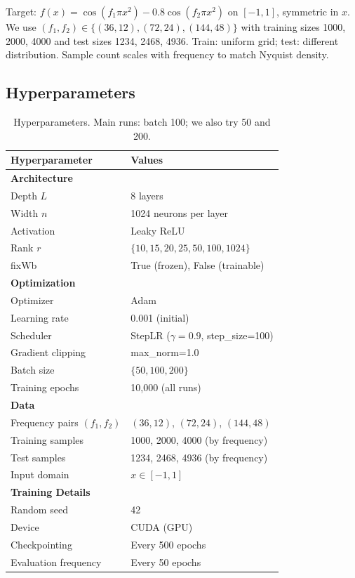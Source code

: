 \documentclass[nohyperref]{article}
\theoremstyle{plain}
\theoremstyle{definition}
\theoremstyle{remark}
\begin{document}
Target: $f(x)=\cos(f_1\pi x^2)-0.8\cos(f_2\pi x^2)$ on $[-1,1]$, symmetric in $x$. We use $(f_1,f_2)\in\{(36,12),(72,24),(144,48)\}$ with training sizes 1000, 2000, 4000 and test sizes 1234, 2468, 4936. Train: uniform grid; test: different distribution. Sample count scales with frequency to match Nyquist density.

\subsection{Hyperparameters}
\label{app:hyperparams}

\begin{table}[htbp!]
\centering
\caption{Hyperparameters. Main runs: batch 100; we also try 50 and 200.}
\label{tab:hyperparams}
\begin{tabular}{ll}
\toprule
\textbf{Hyperparameter} & \textbf{Values} \\
\midrule
\textbf{Architecture} & \\
\quad Depth $L$ & 8 layers \\
\quad Width $n$ & 1024 neurons per layer \\
\quad Activation & Leaky ReLU \\
\quad Rank $r$ & $\{10, 15, 20, 25, 50, 100, 1024\}$ \\
\quad fixWb & True (frozen), False (trainable) \\
\midrule
\textbf{Optimization} & \\
\quad Optimizer & Adam \\
\quad Learning rate & 0.001 (initial) \\
\quad Scheduler & StepLR ($\gamma=0.9$, step\_size=100) \\
\quad Gradient clipping & max\_norm=1.0 \\
\quad Batch size & $\{50, 100, 200\}$ \\
\quad Training epochs & 10,000 (all runs) \\
\midrule
\textbf{Data} & \\
\quad Frequency pairs $(f_1, f_2)$ & $(36, 12)$, $(72, 24)$, $(144, 48)$ \\
\quad Training samples & 1000, 2000, 4000 (by frequency) \\
\quad Test samples & 1234, 2468, 4936 (by frequency) \\
\quad Input domain & $x \in [-1, 1]$ \\
\midrule
\textbf{Training Details} & \\
\quad Random seed & 42 \\
\quad Device & CUDA (GPU) \\
\quad Checkpointing & Every 500 epochs \\
\quad Evaluation frequency & Every 50 epochs \\
\bottomrule
\end{tabular}
\end{table}
\end{document}
